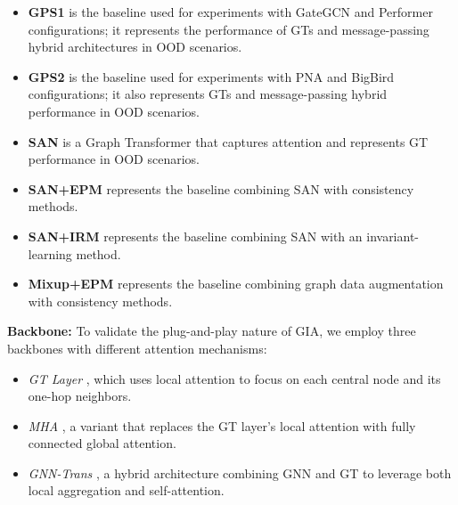 \documentclass[a4paper,fleqn]{cas-dc}
\begin{document}
\begin{itemize}
  \item {\color{blue}\textbf{GPS1} \cite{rampavsek2022recipe} is the baseline used for experiments with GateGCN and Performer configurations; it represents the performance of GTs and message-passing hybrid architectures in OOD scenarios.}
  \item {\color{blue}\textbf{GPS2} \cite{rampavsek2022recipe} is the baseline used for experiments with PNA and BigBird configurations; it also represents GTs and message-passing hybrid performance in OOD scenarios.}
  \item {\color{blue}\textbf{SAN} \cite{kreuzer2021rethinking} is a Graph Transformer that captures attention and represents GT performance in OOD scenarios.}
  \item {\color{blue}\textbf{SAN+EPM} represents the baseline combining SAN with consistency methods.}
  \item {\color{blue}\textbf{SAN+IRM} represents the baseline combining SAN with an invariant-learning method.}
  \item {\color{blue}\textbf{Mixup+EPM}\cite{wang2021mixup} represents the baseline combining graph data augmentation with consistency methods.}
\end{itemize}

\textbf{Backbone:} To validate the plug-and-play nature of GIA, we employ three backbones with different attention mechanisms:
\begin{itemize}
  \item \emph{GT Layer} \cite{dwivedi2021generalization}, which uses local attention to focus on each central node and its one-hop neighbors.
  \item \emph{MHA} \cite{dwivedi2021generalization}, a variant that replaces the GT layer's local attention with fully connected global attention.
  \item \emph{GNN-Trans} \cite{wu2021representing}, a hybrid architecture combining GNN and GT to leverage both local aggregation and self-attention.
\end{itemize}
\end{document}
